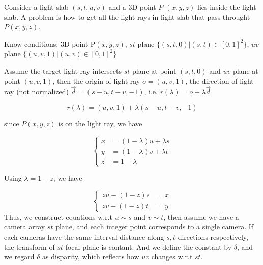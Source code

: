 \documentclass[acmtog]{acmart}
\begin{document}
 	\quad Consider a light slab $(s, t, u, v)$ and a 3D point $P$ $(x,y,z)$ lies inside the light slab. A problem is how to get all the light rays in light slab that pass throught $P(x,y,z)$.
 	
 	\quad Know conditions: 3D point P$(x,y,z)$,  $st$ plane $\{(s, t, 0) | (s,t)\in[0, 1]^2\}$, $uv$ plane $\{(u, v, 1)| (u,v)\in[0, 1]^2\}$
 	
 	\quad Assume the target light ray intersects $st$ plane at point $(s, t, 0)$ and $uv$ plane at point $(u, v, 1)$, then the origin of light ray $\dot{o}=(u,v,1)$, the direction of light ray (not normalized) $\vec{d}=(s-u, t-v ,-1)$, i.e. $r(\lambda)=\dot o+ \lambda \vec{d}$
 	
 	\[
 	r(\lambda)=(u, v, 1) + \lambda(s-u, t-v, -1)
 	\]
 	
 	 \quad since $P(x,y,z)$ is on the light ray, we have
 	 
 	 \[
		\begin{cases}
			x &= (1-\lambda)u+\lambda s\\
			y &= (1-\lambda)v+\lambda t\\
			z &= 1-\lambda
		\end{cases}
 	 \]
 	 
	\quad Using $\lambda=1-z$, we have
	
	\[
		\begin{cases}
			zu - (1-z)s &= x \\
			zv - (1-z)t &= y
		\end{cases}
	\]
	\quad Thus, we construct equations w.r.t $u\sim s$ and $v\sim t$, then assume we have a camera array $st$ plane, and each integer point corresponds to a single camera. If each cameras have the same interval distance along $s,t$ directions respectively, the transform of $st$ focal plane is contant. And we define the constant by $\delta$, and we regard $\delta$ as disparity, which reflects how $uv$ changes w.r.t $st$.
	
\end{document}
